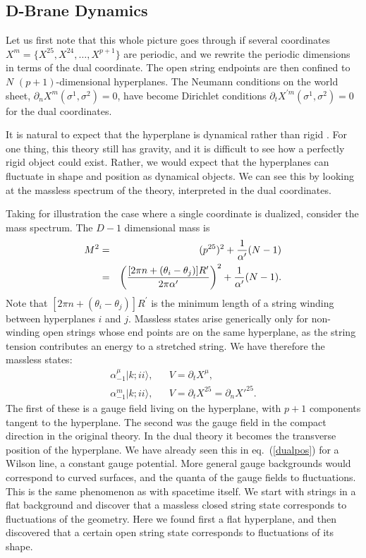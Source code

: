 \documentclass[12pt]{article}
\def\bea{\begin{eqnarray}}
\def\eea{\end{eqnarray}}
\def\ap{\alpha'}
\begin{document}
\subsection{D-Brane Dynamics}

Let us first note that this whole picture goes through if several
coordinates $X^m=\{X^{25},X^{24},\ldots,X^{p+1}\}$ are periodic, and we
rewrite the periodic dimensions in terms of the dual coordinate.  The open
string endpoints are then confined to $N$ $(p+1)$-dimensional
hyperplanes.  The Neumann conditions on the world sheet, $\partial_n
X^m(\sigma^1,\sigma^2)=0$, have become Dirichlet conditions $\partial_t
X^{\prime m}(\sigma^1,\sigma^2)=0$ for the dual coordinates.

It is natural to expect that the hyperplane is dynamical rather than
rigid \cite{dlp}. For one thing, this theory still has gravity, and
it is difficult to see how a perfectly rigid object could exist.
Rather, we would expect
that the hyperplanes can fluctuate in shape and position as dynamical
objects. We can see this by looking at the massless spectrum of the theory,
interpreted in the dual coordinates.

Taking for illustration the case where a single coordinate is dualized,
consider the mass spectrum.  The $D-1$ dimensional mass is
\bea
M^2 &=& (p^{25})^2+{1\over\ap}({N}-1) \nonumber\\
&=& \left( {[2\pi n+(\theta_i-\theta_j)]R^\prime\over2\pi\ap}
\right)^2 +{1\over\ap}(N-1).
\eea
Note that $[2\pi
n+(\theta_i-\theta_j)]R^\prime$ is the minimum length of a string winding
between hyperplanes $i$ and $j$.  Massless states arise
generically only for non-winding open strings whose end points are on the
same hyperplane, as the string tension contributes an energy to a stretched
string.  We have therefore the massless states:
\bea
\alpha^{\mu}_{-1}|{ k};ii\rangle, && V = \partial_t X^\mu, \nonumber\\
\alpha^{m}_{-1}|{ k};ii\rangle, && V = \partial_t X^{25} = \partial_n
X'^{25}.
\eea
The first of these is a gauge field
living on the hyperplane, with $p+1$ components tangent to the hyperplane. 
The second was the gauge field in the compact direction in the original
theory.  In the dual theory it becomes the transverse position of the
hyperplane.  We have already seen this in eq.~(\ref{dualpos}) for a Wilson
line, a constant gauge potential.  More general gauge backgrounds would
correspond to curved surfaces, and the quanta of the gauge fields to
fluctuations.  This is the same phenomenon as with spacetime itself.  We start
with strings in a flat background and discover that a massless closed
string state corresponds to fluctuations of the geometry.  Here we found
first a flat hyperplane, and then discovered that a certain open string
state corresponds to fluctuations of its shape.
\end{document}
